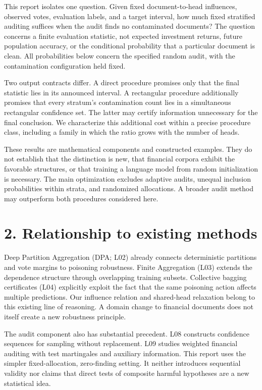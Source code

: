 \documentclass[11pt]{article}
\begin{document}
This report isolates one question. Given fixed document-to-head influences, observed votes, evaluation labels, and a target interval, how much fixed stratified auditing suffices when the audit finds no contaminated documents? The question concerns a finite evaluation statistic, not expected investment returns, future population accuracy, or the conditional probability that a particular document is clean. All probabilities below concern the specified random audit, with the contamination configuration held fixed.

Two output contracts differ. A direct procedure promises only that the final statistic lies in its announced interval. A rectangular procedure additionally promises that every stratum's contamination count lies in a simultaneous rectangular confidence set. The latter may certify information unnecessary for the final conclusion. We characterize this additional cost within a precise procedure class, including a family in which the ratio grows with the number of heads.

These results are mathematical components and constructed examples. They do not establish that the distinction is new, that financial corpora exhibit the favorable structures, or that training a language model from random initialization is necessary. The main optimization excludes adaptive audits, unequal inclusion probabilities within strata, and randomized allocations. A broader audit method may outperform both procedures considered here.

\section*{2. Relationship to existing methods}

Deep Partition Aggregation (DPA; L02) already connects deterministic partitions and vote margins to poisoning robustness. Finite Aggregation (L03) extends the dependence structure through overlapping training subsets. Collective bagging certificates (L04) explicitly exploit the fact that the same poisoning action affects multiple predictions. Our influence relation and shared-head relaxation belong to this existing line of reasoning. A domain change to financial documents does not itself create a new robustness principle.

The audit component also has substantial precedent. L08 constructs confidence sequences for sampling without replacement. L09 studies weighted financial auditing with test martingales and auxiliary information. This report uses the simpler fixed-allocation, zero-finding setting. It neither introduces sequential validity nor claims that direct tests of composite harmful hypotheses are a new statistical idea.
\end{document}

